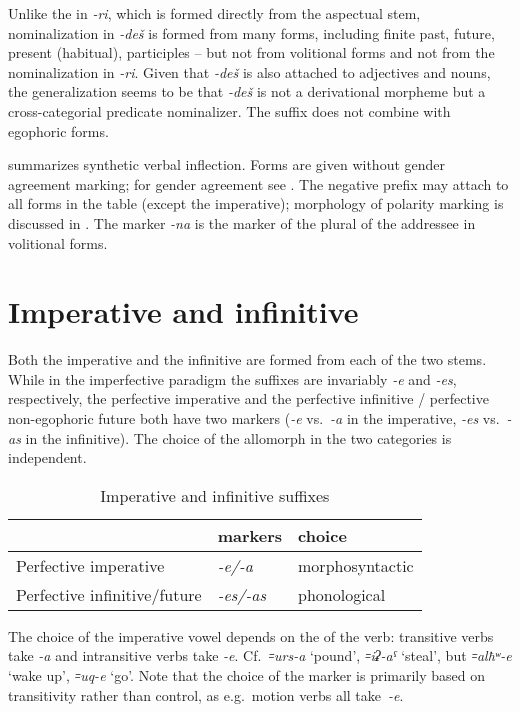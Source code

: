 \documentclass[output=paper]{langsci/langscibook}
\begin{document}
Unlike the  in \emph{-ri}, which is formed directly from
the aspectual stem, nominalization in \emph{-deš} is formed from many
forms, including finite past, future, present (habitual), participles –
but not from volitional forms and not from the nominalization in
\emph{-ri}. Given that \emph{-deš} is also attached to adjectives and
nouns, the generalization seems to be that \emph{-deš} is not a
derivational morpheme but a cross-categorial predicate nominalizer. The
suffix does not combine with egophoric forms.

summarizes synthetic verbal inflection. Forms are given
without gender agreement marking; for gender agreement see .
The negative prefix may attach to all forms in the table (except the imperative); 
morphology of polarity marking is discussed in . The
marker \emph{-na} is the marker of the plural of the addressee in
volitional forms.

\section{Imperative and infinitive}\label{imperative-and-infinitive}


Both the imperative and the infinitive are formed from each of the two
stems. While in the imperfective paradigm the suffixes are invariably
\emph{-e} and \emph{-es}, respectively, the perfective imperative and
the perfective infinitive / perfective non-egophoric future both have two markers (\emph{-e} vs.\ \emph{-a}
in the imperative, \emph{-es} vs.\ \emph{-as} in the infinitive). The
choice of the allomorph in the two categories is independent.


\begin{table}[h]
\caption{Imperative and infinitive suffixes}

\begin{tabular}{@{}lll@{}}
\toprule
& markers & choice\tabularnewline \midrule 
Perfective imperative & \emph{-e/-a} & morphosyntactic\tabularnewline
Perfective infinitive/future & \emph{-es/-as} & phonological\tabularnewline
\bottomrule
\end{tabular}
\end{table}

The choice of the imperative vowel depends on the  of the
verb: transitive verbs take \emph{-a} and intransitive verbs take
\emph{-e}. Cf.\ \emph{꞊urs-a} `pound', \mbox{\emph{꞊iʡ-aˤ}} `steal', but
\emph{꞊alħʷ-e} `wake up', \emph{꞊uq-e} `go'. Note that the choice of the
marker is primarily based on transitivity rather than control, as e.g.\
motion verbs all take~\mbox{\emph{-e}}.
\end{document}
